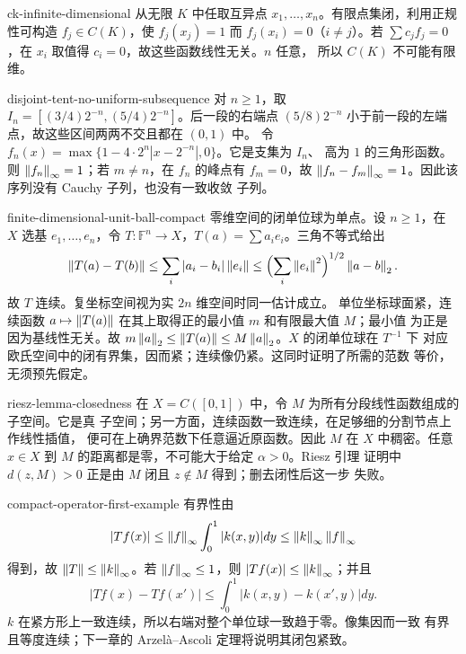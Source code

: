 \begin{solution}{ck-infinite-dimensional}
从无限 $K$ 中任取互异点 $x_1,\ldots,x_n$。有限点集闭，利用正规性可构造
$f_j\in C(K)$，使 $f_j(x_j)=1$ 而 $f_j(x_i)=0$（$i\ne j$）。若
$\sum c_jf_j=0$，在 $x_i$ 取值得 $c_i=0$，故这些函数线性无关。$n$ 任意，
所以 $C(K)$ 不可能有限维。
\end{solution}

\begin{solution}{disjoint-tent-no-uniform-subsequence}
对 $n\ge1$，取
$I_n=[(3/4)2^{-n},(5/4)2^{-n}]$。后一段的右端点
$(5/8)2^{-n}$ 小于前一段的左端点，故这些区间两两不交且都在 $(0,1)$ 中。
令 $f_n(x)=\max\{1-4\cdot2^n|x-2^{-n}|,0\}$。它是支集为 $I_n$、
高为 $1$ 的三角形函数。则
$\left\lVert f_n\right\rVert_\infty=1$；若 $m\ne n$，在 $f_n$ 的峰点有 $f_m=0$，故
$\left\lVert f_n-f_m\right\rVert_\infty=1$。因此该序列没有 Cauchy 子列，也没有一致收敛
子列。
\end{solution}

\begin{solution}{finite-dimensional-unit-ball-compact}
零维空间的闭单位球为单点。设 $n\ge1$，在 $X$ 选基 $e_1,\ldots,e_n$，令
$T:\mathbb F^n\to X$，$T(a)=\sum a_ie_i$。三角不等式给出
\[
 \left\lVert T(a)-T(b)\right\rVert\le\sum_i|a_i-b_i|\left\lVert e_i\right\rVert
 \le\Bigl(\sum_i\left\lVert e_i\right\rVert^2\Bigr)^{1/2}\left\lVert a-b\right\rVert_2.
\]
故 $T$ 连续。复坐标空间视为实 $2n$ 维空间时同一估计成立。
单位坐标球面紧，连续函数
$a\mapsto\left\lVert T(a)\right\rVert$ 在其上取得正的最小值 $m$ 和有限最大值 $M$；最小值
为正是因为基线性无关。故
$m\left\lVert a\right\rVert_2\le\left\lVert T(a)\right\rVert\le M\left\lVert a\right\rVert_2$。$X$ 的闭单位球在 $T^{-1}$ 下
对应欧氏空间中的闭有界集，因而紧；连续像仍紧。这同时证明了所需的范数
等价，无须预先假定。
\end{solution}

\begin{solution}{riesz-lemma-closedness}
在 $X=C([0,1])$ 中，令 $M$ 为所有分段线性函数组成的子空间。它是真
子空间；另一方面，连续函数一致连续，在足够细的分割节点上作线性插值，
便可在上确界范数下任意逼近原函数。因此 $M$ 在 $X$ 中稠密。任意
$x\in X$ 到 $M$ 的距离都是零，不可能大于给定 $\alpha>0$。Riesz 引理
证明中 $d(z,M)>0$ 正是由 $M$ 闭且 $z\notin M$ 得到；删去闭性后这一步
失败。
\end{solution}

\begin{solution}{compact-operator-first-example}
有界性由
\[
 |Tf(x)|\le\left\lVert f\right\rVert_\infty\int_0^1|k(x,y)|dy
 \le\left\lVert k\right\rVert_\infty\left\lVert f\right\rVert_\infty
\]
得到，故 $\left\lVert T\right\rVert\le\left\lVert k\right\rVert_\infty$。若 $\left\lVert f\right\rVert_\infty\le1$，则
$|Tf(x)|\le\left\lVert k\right\rVert_\infty$；并且
\[
 |Tf(x)-Tf(x')|\le\int_0^1|k(x,y)-k(x',y)|dy.
\]
$k$ 在紧方形上一致连续，所以右端对整个单位球一致趋于零。像集因而一致
有界且等度连续；下一章的 Arzelà--Ascoli 定理将说明其闭包紧致。
\end{solution}
